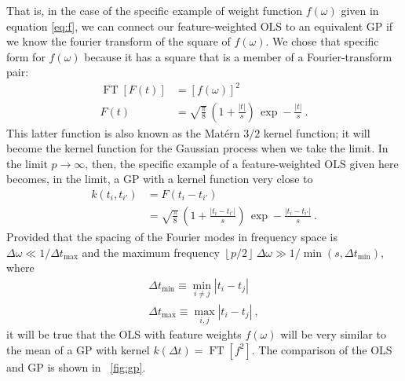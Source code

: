 \documentclass[12pt,letterpaper]{article}
\newcommand{\floor}[1]{\left\lfloor #1 \right\rfloor}
\DeclareMathOperator{\FT}{FT}
\begin{document}
That is, in the case of the specific example of weight function $f(\omega)$ given in equation \eqref{eq:f}, we can connect our feature-weighted OLS to an equivalent GP if we know the fourier transform of the square of $f(\omega)$. We chose that specific form for $f(\omega)$ because it has a square that is a member of a Fourier-transform pair:
\begin{align}
    \FT[F(t)] &= [f(\omega)]^2
    \\ \label{eq:F}
    F(t) &= \sqrt{\frac{\pi}{8}}\,\left(1 + \frac{|t|}{s}\right)\,\exp -\frac{|t|}{s}
    ~.
\end{align}
This latter function is also known as the Mat\'ern $3/2$ kernel function; it will become the kernel function for the Gaussian process when we take the limit.
In the limit $p\rightarrow\infty$, then, the specific example of a feature-weighted OLS given here becomes, in the limit, a GP with a kernel function very close to
\begin{align}
    k(t_i,t_{i'}) &= F(t_i-t_{i'})
    \\ \label{eq:k}
    &= \sqrt{\frac{\pi}{8}}\,\left(1 + \frac{|t_i - t_{i'}|}{s}\right)\,\exp -\frac{|t_i - t_{i'}|}{s}
    ~.
\end{align}
Provided that the spacing of the Fourier modes in frequency space is $\Delta\omega\ll 1 / \Delta t_{\max}$ and the maximum frequency $\floor{p / 2}\,\Delta\omega \gg 1 / \min(s, \Delta t_{\min})$, where
\begin{align}
    \Delta t_{\min} \equiv \min_{i\ne j}|t_i - t_j|
    \\
    \Delta t_{\max} \equiv \max_{i,j}|t_i - t_j|
    ~,
\end{align}
it will be true that the OLS with feature weights $f(\omega)$ will be very similar to the mean of a GP with kernel $k(\Delta t) = \FT[f^2]$.
The comparison of the OLS and GP is shown in \figurename~\ref{fig:gp}.
\end{document}
